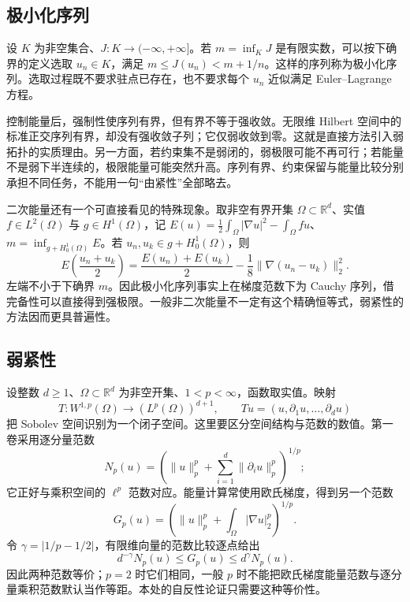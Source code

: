 \subsection{极小化序列}
\label{b2:subsec:140402}

设 \(K\) 为非空集合、\(J:K\to(-\infty,+\infty]\)。若 \(m=\inf_KJ\) 是有限实数，可以按下确界的定义选取 \(u_n\in K\)，满足 \(m\le J(u_n)<m+1/n\)。这样的序列称为极小化序列。选取过程既不要求驻点已存在，也不要求每个 \(u_n\) 近似满足 Euler--Lagrange 方程。

\ProseParagraphBreak

控制能量后，强制性使序列有界，但有界不等于强收敛。无限维 Hilbert 空间中的标准正交序列有界，却没有强收敛子列；它仅弱收敛到零。这就是直接方法引入弱拓扑的实质理由。另一方面，若约束集不是弱闭的，弱极限可能不再可行；若能量不是弱下半连续的，极限能量可能突然升高。序列有界、约束保留与能量比较分别承担不同任务，不能用一句“由紧性”全部略去。

\ProseParagraphBreak

二次能量还有一个可直接看见的特殊现象。取非空有界开集 \(\Omega\subset\mathbb R^d\)、实值 \(f\in L^2(\Omega)\) 与 \(g\in H^1(\Omega)\)，记 \(E(u)=\tfrac12\int_\Omega|\nabla u|^2-\int_\Omega fu\)、\(m=\inf_{g+H_0^1(\Omega)}E\)。若 \(u_n,u_k\in g+H_0^1(\Omega)\)，则
\[
 E\left(\frac{u_n+u_k}{2}\right)
 =\frac{E(u_n)+E(u_k)}2-\frac18\lVert\nabla(u_n-u_k)\rVert_2^2.
\]
左端不小于下确界 \(m\)。因此极小化序列事实上在梯度范数下为 Cauchy 序列，借完备性可以直接得到强极限。一般非二次能量不一定有这个精确恒等式，弱紧性的方法因而更具普遍性。

\subsection{弱紧性}
\label{b2:subsec:140403}

设整数 \(d\geq1\)、\(\Omega\subset\mathbb R^d\) 为非空开集、\(1<p<\infty\)，函数取实值。映射
\[
 T:W^{1,p}(\Omega)\longrightarrow(L^p(\Omega))^{d+1},\qquad
 Tu=(u,\partial_1u,\ldots,\partial_du)
\]
把 Sobolev 空间识别为一个闭子空间。这里要区分空间结构与范数的数值。第一卷采用逐分量范数
\[
 N_p(u)=\left(\|u\|_p^p+\sum_{i=1}^d\|\partial_i u\|_p^p\right)^{1/p};
\]
它正好与乘积空间的 \(\ell^p\) 范数对应。能量计算常使用欧氏梯度，得到另一个范数
\[
 G_p(u)=\left(\|u\|_p^p+\int_\Omega|\nabla u|_2^p\right)^{1/p}.
\]
令 \(\gamma=|1/p-1/2|\)，有限维向量的范数比较逐点给出
\[
 d^{-\gamma}N_p(u)\leq G_p(u)\leq d^\gamma N_p(u).
\]
因此两种范数等价；\(p=2\) 时它们相同，一般 \(p\) 时不能把欧氏梯度能量范数与逐分量乘积范数默认当作等距。本处的自反性论证只需要这种等价性。

